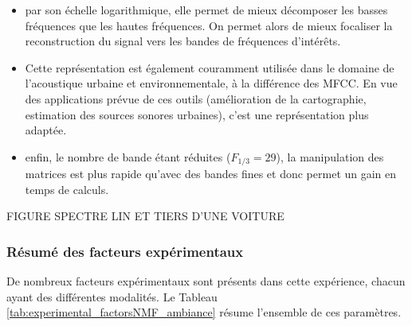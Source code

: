 \begin{itemize}
\item par son échelle logarithmique, elle permet de mieux décomposer les basses fréquences que les hautes fréquences. On permet alors de mieux focaliser la reconstruction du signal vers les bandes de fréquences d'intérêts.
\item Cette représentation est également couramment utilisée dans le domaine de l'acoustique urbaine et environnementale, à la différence des MFCC. En vue des applications prévue de ces outils (amélioration de la cartographie, estimation des sources sonores urbaines), c'est une représentation plus adaptée.
\item enfin, le nombre de bande étant réduites ($F_{1/3} = 29$), la manipulation des matrices est plus rapide qu'avec des bandes fines et donc permet un gain en temps de calculs.
\end{itemize}

FIGURE SPECTRE LIN ET TIERS D'UNE VOITURE

\subsubsection{Résumé des facteurs expérimentaux}

De nombreux facteurs expérimentaux sont présents dans cette expérience, chacun ayant des différentes modalités. Le Tableau \ref{tab:experimental_factorsNMF_ambiance} résume l'ensemble de ces paramètres.

